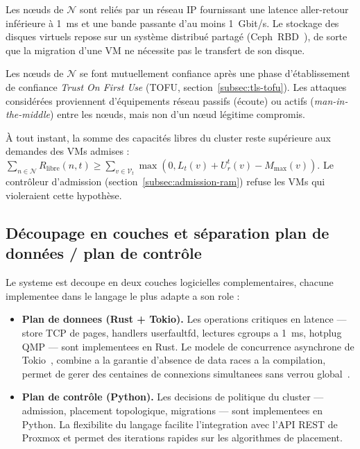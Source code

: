 \begin{hypothese}
\label{hyp:reseau-stockage}
Les nœuds de $\mathcal{N}$ sont reliés par un réseau IP fournissant une latence aller-retour inférieure à 1~ms et une bande passante d'au moins 1~Gbit/s. Le stockage des disques virtuels repose sur un système distribué partagé (Ceph~RBD~\cite{ceph_doc}), de sorte que la migration d'une VM ne nécessite pas le transfert de son disque.
\end{hypothese}

\begin{hypothese}
\label{hyp:confiance}
Les nœuds de $\mathcal{N}$ se font mutuellement confiance après une phase d'établissement de confiance \emph{Trust On First Use} (TOFU, section~\ref{subsec:tls-tofu}). Les attaques considérées proviennent d'équipements réseau passifs (écoute) ou actifs (\emph{man-in-the-middle}) entre les nœuds, mais non d'un nœud légitime compromis.
\end{hypothese}

\begin{hypothese}
\label{hyp:capacite-globale}
À tout instant, la somme des capacités libres du cluster reste supérieure aux demandes des VMs admises : $\sum_{n \in \mathcal{N}} R_{\text{libre}}(n, t) \geq \sum_{v \in \mathcal{V}_t} \max(0, L_t(v) + U_r^t(v) - M_{\max}(v))$. Le contrôleur d'admission (section~\ref{subsec:admission-ram}) refuse les VMs qui violeraient cette hypothèse.
\end{hypothese}

\subsection{Découpage en couches et séparation plan de données / plan de contrôle}
\label{subsec:couches-rust-python}

Le systeme est decoupe en deux couches logicielles complementaires, chacune implementee dans le langage le plus adapte a son role :

\begin{itemize}
    \item \textbf{Plan de donnees (Rust + Tokio).} Les operations critiques en latence --- store TCP de pages, handlers userfaultfd, lectures cgroups a 1~ms, hotplug QMP --- sont implementees en Rust. Le modele de concurrence asynchrone de Tokio~\cite{tokio_doc}, combine a la garantie d'absence de data races a la compilation, permet de gerer des centaines de connexions simultanees sans verrou global~\cite{rust_lang}.
    \item \textbf{Plan de contr\^ole (Python).} Les decisions de politique du cluster --- admission, placement topologique, migrations --- sont implementees en Python. La flexibilite du langage facilite l'integration avec l'API REST de Proxmox et permet des iterations rapides sur les algorithmes de placement.
\end{itemize}

